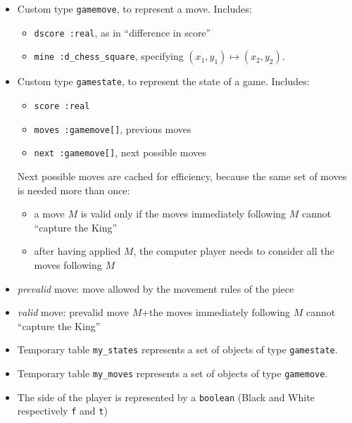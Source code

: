 \begin{itemize}
\item Custom type \verb+gamemove+, to represent a move. Includes:
  \begin{itemize}
  \item \verb+dscore :real+, as in ``difference in score''
  \item \verb+mine :d_chess_square+, specifying $(x_1,y_1)\mapsto(x_2,y_2)$.
  \end{itemize}

\item Custom type \verb+gamestate+, to represent the state of a
  game. Includes:
  \begin{itemize}
  \item \verb+score :real+
  \item \verb+moves :gamemove[]+, previous moves
  \item \verb+next :gamemove[]+, next possible moves
  \end{itemize}

  \begin{rem} Next possible moves are cached for efficiency, because
    the same set of moves is needed more than once:
    \begin{itemize}
    \item a move $M$ is valid only if the moves immediately following
      $M$ cannot ``capture the King''
    \item after having applied $M$, the computer player needs to
      consider all the moves following $M$
    \end{itemize}
  \end{rem}

\item \emph{prevalid} move: move allowed by the movement rules of the
  piece

\item \emph{valid} move: prevalid move $M$\quad +\quad the moves
  immediately following $M$ cannot ``capture the King''

\item Temporary table \verb+my_states+ represents a set of objects of
  type \verb+gamestate+.

\item Temporary table \verb+my_moves+ represents a set of objects of
  type \verb+gamemove+.

\item The side of the player is represented by a \verb+boolean+ (Black
  and White respectively \verb+f+ and \verb+t+)


\end{itemize}
